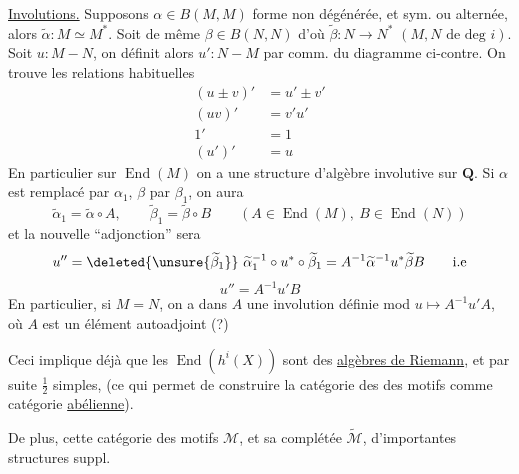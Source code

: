 \uline{Involutions.} Supposons $\alpha\in B(M,M)$ forme   non dégénérée, et sym. ou  alternée, alors   $\widetilde\alpha:M\simeq M^{*}$. Soit de même $\beta\in B(N,N)$ d'où $\widetilde\beta:N\longrightarrow N^{*}$ $(M,N\text{ de deg }i)$.
Soit $u:M\mathbin{-}N$, on définit alors $u':N\mathbin{-}M$ par comm. du diagramme ci-contre.
On trouve les relations habituelles
\[
\begin{aligned}
(u\pm v)'&=u'\pm v'\\
(uv)'&=v'u'\\
1'&=1\\
(u')'&=u
\end{aligned}
\]
En particulier sur $\operatorname{End}(M)$ on a une structure d'algèbre involutive sur $\mathbf Q$. 
Si $\alpha$ est remplacé par $\alpha_1$, $\beta$ par $\beta_1$, on aura
\[
\widetilde\alpha_1=\widetilde\alpha\circ A,\qquad\widetilde\beta_1=\widetilde\beta\circ B\qquad(A\in\operatorname{End}(M),\ B\in\operatorname{End}(N))
\]
et la nouvelle ``adjonction'' sera
\[
u''=\deleted{\unsure{\widetilde\beta_1}}\ \widetilde\alpha_1^{-1}\circ u^{*}\circ\widetilde\beta_1
=A^{-1}\widetilde\alpha^{-1}u^{*}\widetilde\beta B\qquad\text{i.e}
\]
\[
u''=A^{-1}u'B
\]
En particulier, si $M=N$, on a dans $A$ une involution définie mod  $u\mapsto A^{-1}u'A$, où $A$ est un élément autoadjoint (?)


Ceci implique déjà que les $\operatorname{End}(h^i(X))$ sont des \uline{algèbres de Riemann}, et par suite $\frac12$ simples, (ce qui permet de construire la catégorie des des motifs comme catégorie \uline{abélienne}).

De plus, cette catégorie des motifs $\mathcal M$, et sa complétée $\widetilde{\mathcal M}$,  d'importantes structures suppl.

